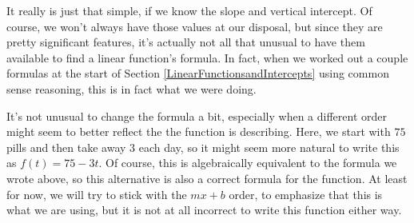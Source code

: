 
\bigskip

It really is just that simple, if we know the slope and vertical intercept. Of course, we won’t always have those values at our disposal, but since they are pretty significant features, it’s actually not all that unusual to have them available to find a linear function’s formula. In fact, when we worked out a couple formulas at the start of Section \ref{LinearFunctionsandIntercepts} using common sense reasoning, this is in fact what we were doing.



\bigskip

It’s not unusual to change the formula a bit, especially when a different order might seem to better reflect the  the function is describing. Here, we start with $75$ pills and then take away $3$ each day, so it might seem more natural to write this as $f(t)=75-3t$. Of course, this is algebraically
equivalent to the formula we wrote above, so this alternative is also a correct formula for the function. At least for now, we will try to stick with the $mx+b$ 	order, to emphasize that this is what we are using, but it is not at all incorrect to write this function either way.

%
%


